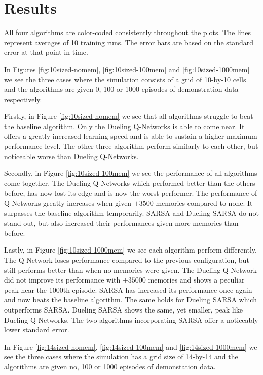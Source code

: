 
\section{Results}
All four algorithms are color-coded consistently throughout the plots. The lines represent averages of 10 training runs. The error bars are based on the standard error at that point in time.

In Figures \ref{fig:10sized-nomem}, \ref{fig:10sized-100mem} and \ref{fig:10sized-1000mem} we see the three cases where the simulation consists of a grid of 10-by-10 cells and the algorithms are given 0, 100 or 1000 episodes of demonstration data respectively.

Firstly, in Figure \ref{fig:10sized-nomem} we see that all algorithms struggle to beat the baseline algorithm. Only the Dueling Q-Networks is able to come near. It offers a greatly increased learning speed and is able to sustain a higher maximum performance level. The other three algorithm perform similarly to each other, but noticeable worse than Dueling Q-Networks.

Secondly, in Figure \ref{fig:10sized-100mem} we see the performance of all algorithms come together. The Dueling Q-Networks which performed better than the others before, has now lost its edge and is now the worst performer. The performance of Q-Networks greatly increases when given $\pm 3500$ memories compared to none. It surpasses the baseline algorithm temporarily. SARSA and Dueling SARSA do not stand out, but also increased their performances given more memories than before.

Lastly, in Figure \ref{fig:10sized-1000mem} we see each algorithm perform differently. The Q-Network loses performance compared to the previous configuration, but still performs better than when no memories were given. The Dueling Q-Network did not improve its performance with $\pm 35000$ memories and shows a peculiar peak near the 1000th episode. SARSA has increased its performance once again and now beats the baseline algorithm. The same holds for Dueling SARSA which outperforms SARSA. Dueling SARSA shows the same, yet smaller, peak like Dueling Q-Networks. The two algorithms incorporating SARSA offer a noticeably lower standard error.

In Figure \ref{fig:14sized-nomem}, \ref{fig:14sized-100mem} and \ref{fig:14sized-1000mem} we see the three cases where the simulation has a grid size of 14-by-14 and the algorithms are given no, 100 or 1000 episodes of demonstation data.

